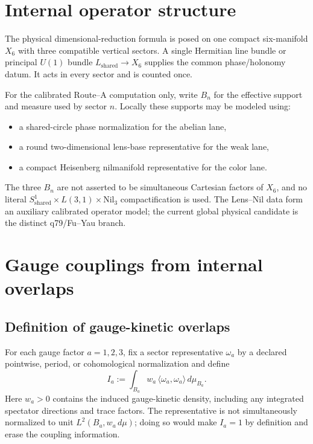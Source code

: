 \documentclass[11pt]{article}
\begin{document}
\section{Internal operator structure}

The physical dimensional-reduction formula is posed on one compact
six-manifold $X_6$ with three compatible vertical sectors. A single Hermitian
line bundle or principal $U(1)$ bundle $L_{\mathrm{shared}}\to X_6$ supplies
the common phase/holonomy datum. It acts in every sector and is counted once.

For the calibrated Route--A computation only, write $B_n$ for the effective
support and measure used by sector $n$. Locally these supports may be modeled
using:
\begin{itemize}
\item a shared-circle phase normalization for the abelian lane,
\item a round two-dimensional lens-base representative for the weak lane,
\item a compact Heisenberg nilmanifold representative for the color lane.
\end{itemize}
The three $B_n$ are not asserted to be simultaneous Cartesian factors of
$X_6$, and no literal
$S^1_{\mathrm{shared}}\times L(3,1)\times\mathrm{Nil}_3$ compactification is
used. The Lens--Nil data form an auxiliary calibrated operator model; the
current global physical candidate is the distinct q79/Fu--Yau branch.

\section{Gauge couplings from internal overlaps}

\subsection{Definition of gauge-kinetic overlaps}

\begin{definition}
For each gauge factor $a=1,2,3$, fix a sector representative $\omega_a$ by a
declared pointwise, period, or cohomological normalization and define
\[
 I_a := \int_{B_a}
 w_a\,\langle \omega_a,\omega_a\rangle\,d\mu_{B_a}.
\]
Here $w_a>0$ contains the induced gauge-kinetic density, including any
integrated spectator directions and trace factors. The representative is not
simultaneously normalized to unit $L^2(B_a,w_a\,d\mu)$; doing so would make
$I_a=1$ by definition and erase the coupling information.
\end{definition}
\end{document}

